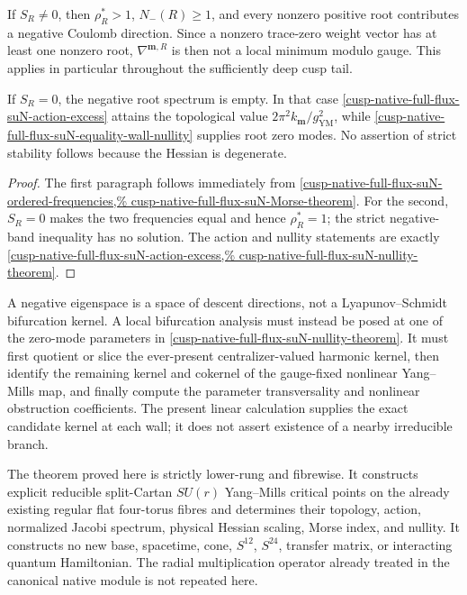 \begin{proposition}
\label{cusp-native-full-flux-suN-stability-boundary}
If \(S_R\ne0\), then \(\rho_R^*>1\), \(N_-(R)\ge1\), and every nonzero
positive root contributes a negative Coulomb direction.  Since a nonzero
trace-zero weight vector has at least one nonzero root,
\(\nabla^{\mathbf m,R}\) is then not a local minimum modulo gauge.  This
applies in particular throughout the sufficiently deep cusp tail.

If \(S_R=0\), the negative root spectrum is empty.  In that case
\cref{cusp-native-full-flux-suN-action-excess} attains the topological value
\(2\pi^2k_{\mathbf m}/g_{\mathrm{YM}}^2\), while
\cref{cusp-native-full-flux-suN-equality-wall-nullity} supplies root zero
modes.  No assertion of strict stability follows because the Hessian is
degenerate.
\end{proposition}

\begin{proof}
The first paragraph follows immediately from
\cref{cusp-native-full-flux-suN-ordered-frequencies,%
cusp-native-full-flux-suN-Morse-theorem}.  For the second,
\(S_R=0\) makes the two frequencies equal and hence \(\rho_R^*=1\); the
strict negative-band inequality has no solution.  The action and nullity
statements are exactly
\cref{cusp-native-full-flux-suN-action-excess,%
cusp-native-full-flux-suN-nullity-theorem}.
\end{proof}

A negative eigenspace is a space of descent directions, not a
Lyapunov--Schmidt bifurcation kernel.  A local bifurcation analysis must
instead be posed at one of the zero-mode parameters in
\cref{cusp-native-full-flux-suN-nullity-theorem}.  It must first quotient or
slice the ever-present centralizer-valued harmonic kernel, then identify the
remaining kernel and cokernel of the gauge-fixed nonlinear Yang--Mills map,
and finally compute the parameter transversality and nonlinear obstruction
coefficients.  The present linear calculation supplies the exact candidate
kernel at each wall; it does not assert existence of a nearby irreducible
branch.

The theorem proved here is strictly lower-rung and fibrewise.  It constructs
explicit reducible split-Cartan \(SU(r)\) Yang--Mills critical points on the
already existing regular flat four-torus fibres and determines their
topology, action, normalized Jacobi spectrum, physical Hessian scaling,
Morse index, and nullity.  It constructs no new base, spacetime, cone,
\(S^{12}\), \(S^{24}\), transfer matrix, or interacting quantum Hamiltonian.
The radial multiplication operator already treated in the canonical native
module is not repeated here.

